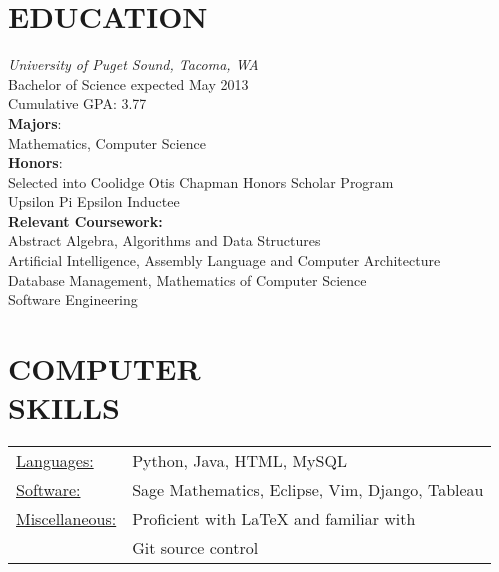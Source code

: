 \documentclass[line,margin,11pt]{res}
\begin{document}
\address{2214 N. Washington Street, Tacoma, WA 98406} 
\address{kwenholz@pugetsound.edu\hspace*{2mm} \vline \hspace*{2mm} (406)546-9210}

 
\begin{resume}
\vspace*{.3cm}

\section{EDUCATION} {\sl University of Puget Sound, Tacoma, WA} \\
                Bachelor of Science
                expected May 2013 \\
                Cumulative GPA: 3.77\\
                \textbf{Majors}: \\
\hspace*{5mm}                Mathematics, Computer Science \\
                \textbf{Honors}:\\
\hspace*{5mm}   Selected into Coolidge Otis Chapman Honors Scholar Program\\
\hspace*{5mm}   Upsilon Pi Epsilon Inductee\\
                \textbf{Relevant Coursework:}\\ 
\hspace*{5mm}                   Abstract Algebra, Algorithms and Data Structures\\
\hspace*{5mm}                   Artificial Intelligence, Assembly Language and Computer Architecture\\
\hspace*{5mm}                   Database Management, Mathematics of Computer Science\\
\hspace*{5mm}                   Software Engineering 
      
\vspace*{.2cm}

\section{COMPUTER \\ SKILLS}
\begin{tabular}{l l}
   \underline{Languages:} & Python, Java, HTML, MySQL\\
   \underline{Software:} & Sage Mathematics, Eclipse, Vim, Django, Tableau\\
   \underline{Miscellaneous:} & Proficient with LaTeX and familiar with\\
        & Git source control
  \end{tabular}


\end{resume}
\end{document}
